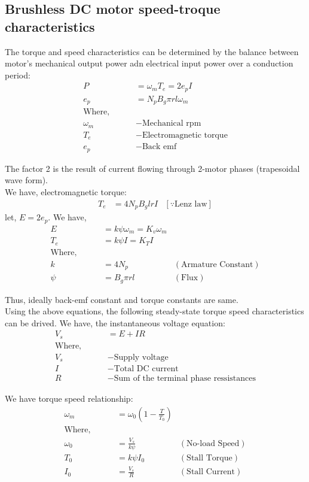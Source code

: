 \subsection{Brushless DC motor speed-troque characteristics \cite{crowder2019electric}}

The torque and speed characteristics can be determined by the balance between motor's mechanical output power adn electrical input power over a conduction period:
\begin{align*}
    P &= \omega_m T_e = 2 e_p I\\
    e_p &= N_p B_g \pi r l \omega_m\\
    \text{Where, } \qquad &\\
    \omega_m &- \text{Mechanical rpm}\\
    T_e      &- \text{Electromagnetic torque}\\
    e_p      &- \text{Back emf}
\end{align*}

The factor 2 is the result of current flowing through 2-motor phases (trapesoidal wave form).\\

We have, electromagnetic torque:
\begin{align*}
    T_e &= 4 N_p B_g l r I &[\because \text{Lenz law}]
\end{align*}
let, $E = 2 e_p$. We have,
\begin{align*}
    E &= k \psi \omega_m = K_v \omega_m\\
    T_e &= k \psi I = K_T I\\
\text{Where, } \qquad &\\
    k &= 4 N_p  &(\text{Armature Constant})\\
    \psi &= B_g \pi  r l  &(\text{Flux})
\end{align*}

Thus, ideally back-emf constant and torque constants are same.\\

Using the above equations, the following steady-state torque speed characteristics can be drived. We have, the instantaneous voltage equation:
\begin{align*}
    V_s &= E + I R\\
\text{Where, } \qquad &\\
    V_s &- \text{Supply voltage}\\
    I &- \text{Total DC current}\\
    R &- \text{Sum of the terminal phase ressistances}
\end{align*}

We have torque speed relationship:
\begin{align*}
    \omega_m &= \omega_0 \left( 1 - \frac{T}{T_0} \right)\\
\text{Where, } \qquad &\\
    \omega_0 &= \frac{V_s}{k \psi} & (\text{No-load Speed})\\
    T_0 &= k \psi I_0              & (\text{Stall Torque})\\
    I_0 &= \frac{V_s}{R}           & (\text{Stall Current})
\end{align*}

